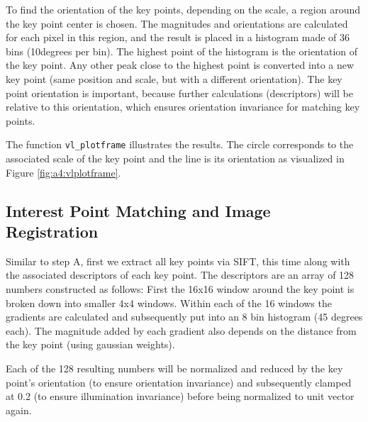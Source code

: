 To find the orientation of the key points, depending on the scale, a region around the key point center is chosen. The magnitudes and orientations are calculated for each pixel in this region, and the result is placed in a histogram made of 36 bins (10degrees per bin). The highest point of the histogram is the orientation of the key point. Any other peak close to the highest point is converted into a new key point (same position and scale, but with a different orientation). The key point orientation is important, because further calculations (descriptors) will be relative to this orientation, which ensures orientation invariance for matching key points.

The function \texttt{vl\_plotframe} illustrates the results. The circle corresponds to the associated scale of the key point and the line is its orientation as visualized in Figure \ref{fig:a4:vlplotframe}.

\subsection{Interest Point Matching and Image Registration}

Similar to step A, first we extract all key points via SIFT, this time along with the associated descriptors of each key point. The descriptors are an array of 128 numbers constructed as follows: First the 16x16 window around the key point is broken down into smaller 4x4 windows. Within each of the 16 windows the gradients are calculated and subsequently put into an 8 bin histogram (45 degrees each). The magnitude added by each gradient also depends on the distance from the key point (using gaussian weights). 

Each of the 128 resulting numbers will be normalized and reduced by the key point's orientation (to ensure orientation invariance) and subsequently clamped at 0.2 (to ensure illumination invariance) before being normalized to unit vector again.

